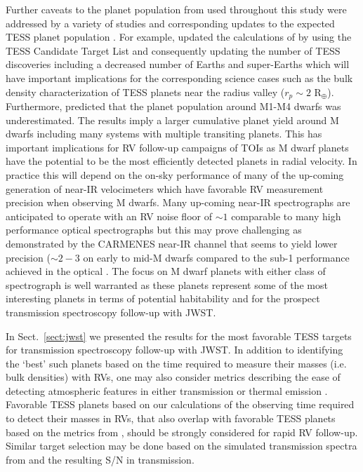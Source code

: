 Further caveats to the planet population from  used throughout this study were
addressed by a variety of studies and corresponding updates to the expected TESS planet population
\citep[e.g.][]{ballard18,barclay18}. 
For example, \cite{barclay18} updated
the calculations of  by using the TESS Candidate Target List \citep{stassun17}
and consequently updating the number of TESS discoveries including a decreased number of Earths and
super-Earths which will have important implications for the corresponding science cases such as
the bulk density characterization of TESS planets near the radius valley ($r_p \sim 2$ R$_{\oplus}$).
Furthermore, \cite{ballard18} predicted that the planet population around M1-M4 dwarfs was
underestimated. The results imply a larger cumulative planet yield around M dwarfs including many
systems with multiple transiting planets. This has important implications for RV follow-up campaigns
of TOIs as M dwarf planets have the potential to be the most efficiently detected planets in radial velocity.
In practice this will depend on the on-sky performance of many of the up-coming generation of near-IR
velocimeters which have favorable RV measurement precision when observing M dwarfs.
Many up-coming near-IR spectrographs are anticipated to operate with an RV noise floor of $\sim 1$
\mps{} comparable to many high performance optical spectrographs but this may prove
challenging as demonstrated by the CARMENES near-IR channel that seems to yield lower precision
($\sim 2-3$ \mps{)} on early to mid-M dwarfs compared to the sub-1 \mps{} performance achieved in the
optical \citep[][c.f. Fig 6]{reiners18}.
The focus on M dwarf planets with either class of spectrograph is well warranted as these planets
represent some of the most interesting planets in terms of potential habitability and for the
prospect transmission spectroscopy follow-up with JWST.

In Sect.~\ref{sect:jwst} we presented the results for the most favorable TESS targets for
transmission spectroscopy follow-up with JWST. In addition to identifying the `best' such planets
based on the time required to measure their masses (i.e. bulk densities) with RVs,
one may also consider metrics
describing the ease of detecting atmospheric features in either transmission or thermal emission
\citep[e.g.][]{kempton18,morgan18}. Favorable TESS planets based on our calculations of
the observing time required to detect their masses in RVs, that also overlap with favorable TESS planets
based on the metrics from \cite{kempton18}, should be strongly considered for rapid RV follow-up.
Similar target selection may be done based on the simulated transmission spectra from \cite{louie18}
and the resulting S/N in transmission.

